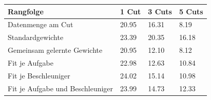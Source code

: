 \begin{tabular}{@{}llll@{}}
\toprule
Rangfolge & 1 Cut & 3 Cuts & 5 Cuts \\
\midrule
Datenmenge am Cut & 20.95 & 16.31 & 8.19 \\
Standardgewichte & 23.39 & 20.35 & 16.18 \\
Gemeinsam gelernte Gewichte & 20.95 & 12.10 & 8.12 \\
Fit je Aufgabe & 22.98 & 12.63 & 10.84 \\
Fit je Beschleuniger & 24.02 & 15.14 & 10.98 \\
Fit je Aufgabe und Beschleuniger & 23.99 & 14.73 & 12.33 \\
\bottomrule
\end{tabular}
